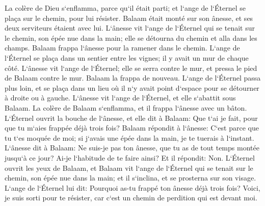 \verse La colère de Dieu s`enflamma, parce qu`il était parti; et l`ange de l`Éternel se plaça sur le chemin, pour lui résister. Balaam était monté sur son ânesse, et ses deux serviteurs étaient avec lui. 
\verse L`ânesse vit l`ange de l`Éternel qui se tenait sur le chemin, son épée nue dans la main; elle se détourna du chemin et alla dans les champs. Balaam frappa l`ânesse pour la ramener dans le chemin. 
\verse L`ange de l`Éternel se plaça dans un sentier entre les vignes; il y avait un mur de chaque côté. 
\verse L`ânesse vit l`ange de l`Éternel; elle se serra contre le mur, et pressa le pied de Balaam contre le mur. Balaam la frappa de nouveau. 
\verse L`ange de l`Éternel passa plus loin, et se plaça dans un lieu où il n`y avait point d`espace pour se détourner à droite ou à gauche. 
\verse L`ânesse vit l`ange de l`Éternel, et elle s`abattit sous Balaam. La colère de Balaam s`enflamma, et il frappa l`ânesse avec un bâton. 
\verse L`Éternel ouvrit la bouche de l`ânesse, et elle dit à Balaam: Que t`ai je fait, pour que tu m`aies frappée déjà trois fois? 
\verse Balaam répondit à l`ânesse: C`est parce que tu t`es moquée de moi; si j`avais une épée dans la main, je te tuerais à l`instant. 
\verse L`ânesse dit à Balaam: Ne suis-je pas ton ânesse, que tu as de tout temps montée jusqu`à ce jour? Ai-je l`habitude de te faire ainsi? Et il répondit: Non. 
\verse L`Éternel ouvrit les yeux de Balaam, et Balaam vit l`ange de l`Éternel qui se tenait sur le chemin, son épée nue dans la main; et il s`inclina, et se prosterna sur son visage. 
\verse L`ange de l`Éternel lui dit: Pourquoi as-tu frappé ton ânesse déjà trois fois? Voici, je suis sorti pour te résister, car c`est un chemin de perdition qui est devant moi. 
